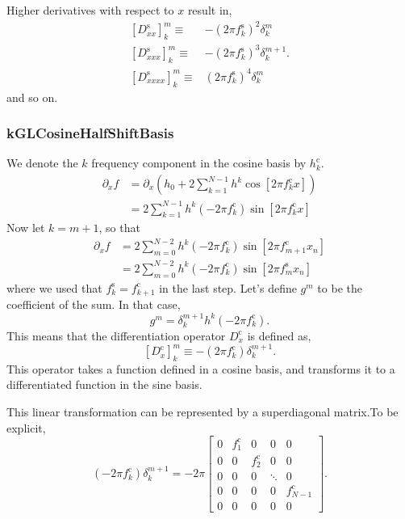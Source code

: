 \documentclass[11pt]{article}
\begin{document}
Higher derivatives with respect to $x$ result in, 
\begin{align}
\left[D_{xx}^{\textrm{s}}\right]^m_k \equiv& - \left( 2 \pi f_k^{\textrm{s}} \right)^2 \delta^{m}_k \\
\left[D_{xxx}^{\textrm{s}}\right]^m_k \equiv&  - \left( 2 \pi f_k^{\textrm{s}} \right)^3 \delta^{m+1}_k. \\
\left[D_{xxxx}^{\textrm{s}}\right]^m_k \equiv& \left( 2 \pi f_k^{\textrm{s}} \right)^4 \delta^{m}_k 
\end{align}
and so on.

\subsubsection{kGLCosineHalfShiftBasis}

We denote the $k$ frequency component in the cosine basis by $h_k^{\textrm{c}}$.
\begin{align}
\partial_x f&= \partial_x  \left( h_{0} + 2 \sum_{k=1}^{N-1}h^k \cos \left[ 2 \pi f_k^{\textrm{c}} x \right] \right)\\
&= 2 \sum_{k=1}^{N-1} h^k \left( -2 \pi f_k^{\textrm{c}} \right) \sin \left[ 2 \pi f_k^{\textrm{c}} x \right]
\end{align}
Now let $k=m+1$, so that
\begin{align}
\partial_x f &= 2 \sum_{m=0}^{N-2}  h^k \left( -2 \pi f_k^{\textrm{c}} \right)\sin \left[ 2 \pi f_{m+1}^{\textrm{c}} x_n \right] \\
&= 2 \sum_{m=0}^{N-2}  h^k \left( -2 \pi f_k^{\textrm{c}} \right) \sin \left[ 2 \pi f_m^{\textrm{s}} x_n \right]
\end{align}
where we used that $f_k^{\textrm{s}}=f_{k+1}^{\textrm{c}}$ in the last step. Let's define $g^m$ to be the coefficient of the sum. In that case,
\begin{equation}
g^m = \delta^{m+1}_k h^k \left( -2 \pi f_k^{\textrm{c}} \right).
\end{equation}
This means that the differentiation operator $D_x^{\textrm{c}}$ is defined as,
\begin{equation}
\left[D_x^{\textrm{c}}\right]^m_k \equiv - \left( 2 \pi f_k^{\textrm{c}} \right) \delta^{m+1}_k.
\end{equation}
This operator takes a function defined in a cosine basis, and transforms it to a differentiated function in the sine basis.

This linear transformation can be represented by a superdiagonal matrix.To be explicit,
\begin{equation}
\left( -2 \pi f_k^{\textrm{c}} \right) \delta^{m+1}_k = -2 \pi \left[\begin{array}{ccccc}0 & f_1^{\textrm{c}} & 0 & 0 & 0 \\0 & 0 & f_2^{\textrm{c}} & 0 & 0 \\0 & 0 & 0 & \ddots & 0 \\0 & 0 & 0 & 0 & f_{N-1}^{\textrm{c}} \\0 & 0 & 0 & 0 & 0\end{array}\right].
\end{equation}
\end{document}
